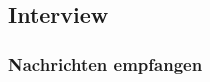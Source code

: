 \subsection{Interview}\label{Interview}
\subsubsection{Nachrichten empfangen}\label{Nachrichten Empfangen}






